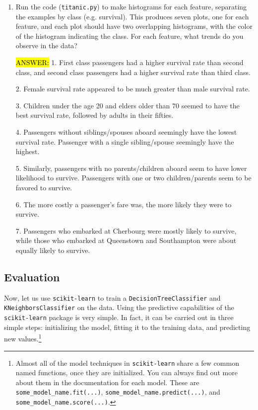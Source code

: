 \begin{enumerate}
\item {} Run the code (\verb|titanic.py|) to make histograms for each feature, separating the examples by class (e.g. survival). This produces seven plots, one for each feature, and each plot should have two overlapping histograms, with the color of the histogram indicating the class. For each feature, what trends do you observe in the data? 

\hl{ANSWER:} 
1. First class passengers had a higher survival rate than second class, and second class passengers had a higher survival rate than third class.

2. Female survival rate appeared to be much greater than male survival rate.

3. Children under the age 20 and elders older than 70 seemed to have the best survival rate, followed by adults in their fifties.

4. Passengers without siblings/spouses aboard seemingly have the lowest survival rate. Passenger with a single sibling/spouse seemingly have the highest.

5. Similarly, passengers with no parents/children aboard seem to have lower likelihood to survive. Passengers with one or two children/parents seem to be favored to survive.

6. The more costly a passenger's fare was, the more likely they were to survive.

7. Passengers who embarked at Cherbourg were mostly likely to survive, while those who embarked at Queenstown and Southampton were about equally likely to survive.

\end{enumerate}


\subsection{Evaluation }

Now, let us use \verb|scikit-learn| to train a \verb|DecisionTreeClassifier| and \verb|KNeighborsClassifier| on the data.
Using the predictive capabilities of the \verb|scikit-learn| package is very simple. In fact, it can be carried out in three simple steps: initializing the model, fitting it to the training data, and predicting new values.\footnote{Almost all of the model techniques in \verb|scikit-learn| share a few common named functions, once they are initialized. You can always find out more about them in the documentation for each model. These are \verb|some_model_name.fit(...)|, \verb|some_model_name.predict(...)|, and \verb|some_model_name.score(...)|.}


